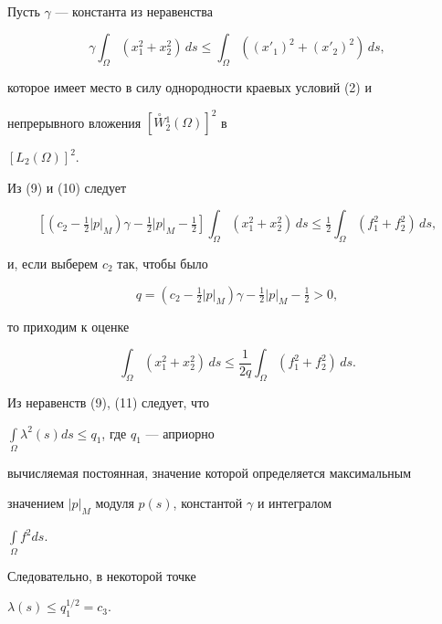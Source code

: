 \begin{pf}
\begin{multline}
\end{multline} 


 


Пусть $\gamma$ --- константа из неравенства 


\begin{equation} 


\gamma\int_\Omega(x^2_1+x^2_2)\,ds\le 


\int_\Omega((x'_1)^2+(x'_2)^2)\,ds, 


\end{equation} 


которое имеет место в силу однородности краевых условий (2) и 


непрерывного вложения $[\overset{\circ}{W}{}^1_2(\Omega)]^2$ в 


$[L_2(\Omega)]^2$. 


 


Из (9) и (10) следует 


$$ 


[(c_2-\tfrac{1}{2}|p|_M)\gamma-\tfrac{1}{2}|p|_M-\tfrac{1}{2}] 


\int_\Omega(x^2_1+x^2_2)\,ds\le\tfrac{1}{2}\int_\Omega 


(f^2_1+f^2_2)\,ds, 


$$ 


и, если выберем $c_2$ так, чтобы было


$$ 


q=(c_2-\tfrac{1}{2}|p|_M)\gamma-\tfrac{1}{2}|p|_M-\tfrac{1}{2}>0, 


$$ 


то приходим к оценке 


\begin{equation} 


\int_\Omega(x^2_1+x^2_2)\,ds\le\frac{1}{2q}\int_\Omega 


(f^2_1+f^2_2)\,ds. 


\end{equation} 


Из неравенств (9), (11) следует, что 


$\int\limits_\Omega\lambda^2(s)ds\le q_1$, где $q_1$ --- априорно 


вычисляемая постоянная, значение которой определяется максимальным 


значением $|p|_M$ модуля $p(s)$, константой $\gamma$ и интегралом 


$\int\limits_\Omega f^2ds$. 


Следовательно, в некоторой точке 


$\lambda(s)\le q^{1/2}_1=c_3$. 


\end{pf} 


